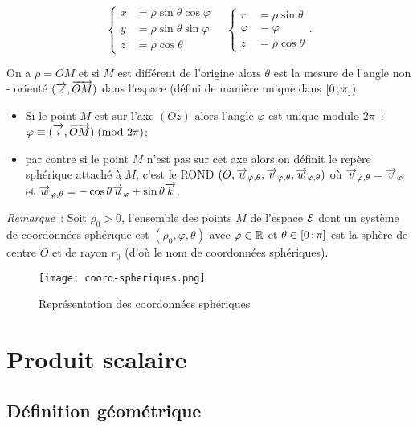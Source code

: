 \begin{equation}
  \begin{cases}
    x &= \rho\sin\theta\cos\varphi\\
    y &= \rho\sin\theta\sin\varphi\\ z &= \rho\cos\theta
  \end{cases}
  \quad
  \begin{cases}
    r & = \rho\sin\theta\\ \varphi& = \varphi\\ z& = \rho\cos\theta
  \end{cases}.
\end{equation}

On a \(\rho = OM\) et si \(M\) est différent de l'origine alors \(\theta\) est
la mesure de l'angle non - orienté \((\overrightarrow{z},\overrightarrow{OM})\) dans l'espace
(défini de manière unique dans \(\left[ 0 \, ; {} \pi \right]\)).
\begin{itemize}
  \item Si le point \(M\) est sur l'axe \((Oz)\) alors l'angle \(\varphi\) est
    unique modulo \(2\pi\)~: \(\varphi \equiv (\overrightarrow{i}, \overrightarrow{OM})\!\pmod {2\pi}\);
  \item par contre si le point \(M\) n'est pas sur cet axe alors on définit le
    repère sphérique attaché à \(M\), c'est le ROND \((O, \overrightarrow{u}_{\varphi,
    \theta},\overrightarrow{v}_{\varphi, \theta},\overrightarrow{w}_{\varphi, \theta})\) où \(\overrightarrow{v}_{\varphi,
    \theta} = \overrightarrow{v}_{\varphi}\) et \(\overrightarrow{w}_{\varphi, \theta} =
    -\cos\theta\overrightarrow{u}_\varphi + \sin\theta\overrightarrow{k}\).
\end{itemize}

\emph{Remarque}~: Soit \(\rho_0>0\), l'ensemble des points \(M\) de l'espace
\(\mathcal{E}\) dont un système de coordonnées sphérique est \((\rho_0, \varphi,
\theta)\) avec \(\varphi\in\mathbb{R}\) et \(\theta\in \left[ 0 \, ; {} \pi \right]\) est la
sphère de centre \(O\) et de rayon \(r_0\) (d'où le nom de coordonnées
sphériques).

\begin{figure}
  \centering
  \texttt{[image: coord-spheriques.png]}
  \caption{Représentation des coordonnées sphériques}
  \label{fig:repsphere}
\end{figure}

\section{Produit scalaire}

\subsection{Définition géométrique}

